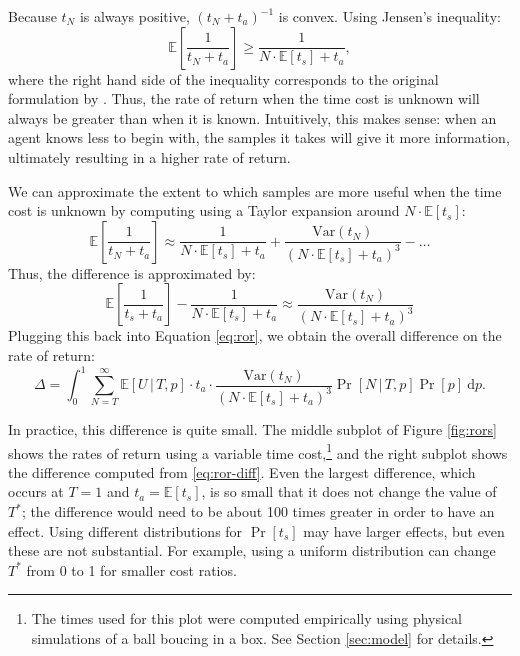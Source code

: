 \documentclass[11pt]{article}
\begin{document}
Because $t_N$ is always positive, $(t_N+t_a)^{-1}$ is convex. Using Jensen's inequality:
\begin{equation}
\mathbb{E}\left[\frac{1}{t_N+t_a}\right]\geq \frac{1}{N\cdot{}\mathbb{E}[t_s]+t_a},
\end{equation}
where the right hand side of the inequality corresponds to the original formulation by . Thus, the rate of return when the time cost is unknown will always be greater than when it is known. Intuitively, this makes sense: when an agent knows less to begin with, the samples it takes will give it more information, ultimately resulting in a higher rate of return.

We can approximate the extent to which samples are more useful when the time cost is unknown by computing using a Taylor expansion around $N\cdot{}\mathbb{E}[t_s]$:
\begin{equation}
\mathbb{E}\left[\frac{1}{t_N+t_a}\right]\approx \frac{1}{N\cdot{}\mathbb{E}[t_s]+t_a}+\frac{\mathrm{Var}(t_N)}{(N\cdot{}\mathbb{E}[t_s]+t_a)^3}-\ldots{}
\end{equation}
Thus, the difference is approximated by:
\begin{equation}
\mathbb{E}\left[\frac{1}{t_s+t_a}\right]-\frac{1}{N\cdot{}\mathbb{E}[t_s]+t_a}\approx \frac{\mathrm{Var}(t_N)}{(N\cdot{}\mathbb{E}[t_s]+t_a)^3}
\end{equation}
Plugging this back into Equation \ref{eq:ror}, we obtain the overall difference on the rate of return:
\begin{equation}
\Delta=\int_0^1 \sum_{N=T}^\infty \mathbb{E}[U\,|\,T,p]\cdot{}t_a\cdot{}\frac{\mathrm{Var}(t_N)}{(N\cdot{}\mathbb{E}[t_s]+t_a)^3}\Pr[N\,|\,T,p]\Pr[p]\ \mathrm{d}p.
\label{eq:ror-diff}
\end{equation}

In practice, this difference is quite small. The middle subplot of Figure \ref{fig:rors} shows the rates of return using a variable time cost,\footnote{The times used for this plot were computed empirically using physical simulations of a ball boucing in a box. See Section \ref{sec:model} for details.} and the right subplot shows the difference computed from \ref{eq:ror-diff}. Even the largest difference, which occurs at $T=1$ and $t_a=\mathbb{E}[t_s]$, is so small that it does not change the value of $T^*$; the difference would need to be about 100 times greater in order to have an effect. Using different distributions for $\Pr[t_s]$ may have larger effects, but even these are not substantial. For example, using a uniform distribution can change $T^*$ from 0 to 1 for smaller cost ratios.
\end{document}

